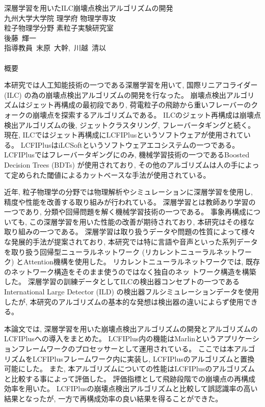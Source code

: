 
\begin{center}
\thispagestyle{empty}
{\Large 深層学習を用いたILC崩壊点検出アルゴリズムの開発}\\
九州大学大学院 理学府 物理学専攻 \\ 粒子物理学分野 素粒子実験研究室 \\
後藤\ 輝一 \\[1ex] 指導教員\ 末原\ 大幹,\ 川越\ 清以\\ 　 \\
{\huge 概要}\\
\end{center}

本研究では人工知能技術の一つである深層学習を用いて, 国際リニアコライダー (ILC) の為の崩壊点検出アルゴリズムの開発を行なった。
崩壊点検出アルゴリズムはジェット再構成の最初段であり, 荷電粒子の飛跡から重いフレーバーのクォークの崩壊点を探索するアルゴリズムである。
ILCのジェット再構成は崩壊点検出アルゴリズムの後, ジェットクラスタリング, フレーバータギングと続く。
現在, ILCではジェット再構成にLCFIPlusというソフトウェアが使用されている。
LCFIPlusはiLCSoftというソフトウェアエコシステムの一つである。
LCFIPlusではフレーバータギングにのみ, 機械学習技術の一つであるBoosted Decision Trees (BDTs) が使用されており, その他のアルゴリズムは人の手によって定められた閾値によるカットベースな手法が使用されている。

近年, 粒子物理学の分野では物理解析やシミュレーションに深層学習を使用し, 精度や性能を改善する取り組みが行われている。
深層学習とは教師あり学習の一つであり, 分類や回帰問題を解く機械学習技術の一つである。
事象再構成についても, この深層学習を用いた性能の改善が期待されており, 本研究はその様な取り組みの一つである。
深層学習は取り扱うデータや問題の性質によって様々な発展的手法が提案されており, 本研究では特に言語や音声といった系列データを取り扱う回帰型ニューラルネットワーク (リカレントニューラルネットワーク) とAttention機構を使用した。
リカレントニューラルネットワークでは, 既存のネットワーク構造をそのまま使うのではなく独自のネッ トワーク構造を構築した。
深層学習の訓練データとしてILCの検出器コンセプトの一つであるInternational Large Detector (ILD) の検出器フルシミュレーションデータを使用したが, 本研究のアルゴリズムの基本的な発想は検出器の違いによらず使用できる。

本論文では, 深層学習を用いた崩壊点検出アルゴリズムの開発とアルゴリズムのLCFIPlusへの導入をまとめた。
LCFIPlus内の機能はMarlinというアプリケーションフレームワークのプロセッサーとして運用されている。
ここでは本アルゴリズムをLCFIPlusフレームワーク内に実装し, LCFIPlusのアルゴリズムと置換可能にした。
また, 本アルゴリズムについての性能はLCFIPlusのアルゴリズムと比較する事によって評価した。
評価指標として飛跡段階での崩壊点の再構成効率を用いた。
LCFIPlusの崩壊点検出アルゴリズムと比較して誤認識率の高い結果となったが, 一方で再構成効率の良い結果を得ることができた。